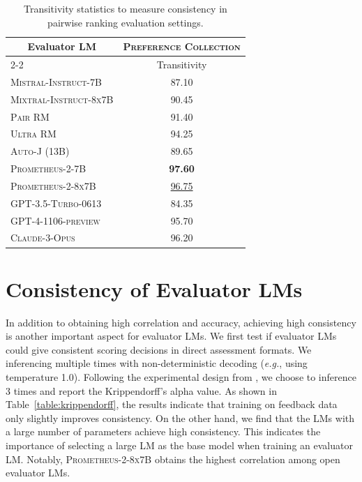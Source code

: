 \documentclass[11pt]{article}
\begin{document}
\begin{table}[H]
\centering
\fontsize{7}{9}\selectfont
\begin{tabular}{lc}
    \toprule
    \multicolumn{1}{c}{\multirow{2}{*}{\textbf{Evaluator LM}}}& \textsc{Preference Collection}\\ 
    \cmidrule(lr){2-2} & Transitivity\\ 
    \midrule
    \textsc{Mistral-Instruct-7B}&87.10\\
    \textsc{Mixtral-Instruct-8x7B}&90.45\\
    \textsc{Pair RM}&91.40\\
    \textsc{Ultra RM}&94.25\\
    \textsc{Auto-J (13B)}&89.65\\
    \textsc{Prometheus-2-7B}&\textbf{97.60}\\
    \textsc{Prometheus-2-8x7B}&\underline{96.75}\\
    \midrule
    \textsc{GPT-3.5-Turbo-0613}&84.35\\
    \textsc{GPT-4-1106-preview}&95.70\\
    \textsc{Claude-3-Opus} &96.20\\
    \bottomrule    
\end{tabular}
\caption{\footnotesize Transitivity statistics to measure consistency in pairwise ranking evaluation settings.}
\label{table:transitivity}
\end{table}


\section{Consistency of Evaluator LMs}\label{appendix:consistency}

In addition to obtaining high correlation and accuracy, achieving high consistency is another important aspect for evaluator LMs. We first test if evaluator LMs could give consistent scoring decisions in direct assessment formats. We inferencing multiple times with non-deterministic decoding (\textit{e.g.}, using temperature 1.0). Following the experimental design from \citet{ye2023flask}, we choose to inference 3 times and report the Krippendorff's alpha value. As shown in Table~\ref{table:krippendorff}, the results indicate that training on feedback data only slightly improves consistency. On the other hand, we find that the LMs with a large number of parameters achieve high consistency. This indicates the importance of selecting a large LM as the base model when training an evaluator LM. Notably, \textsc{Prometheus-2-8x7B} obtains the highest correlation among open evaluator LMs. 
\end{document}
